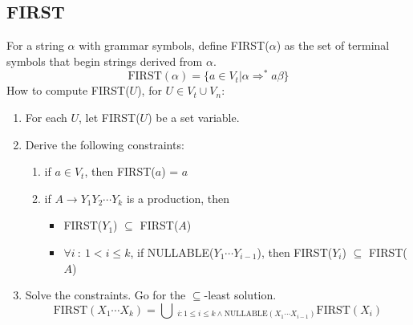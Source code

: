 \documentclass[10pt]{article}
\begin{document}
\subsection*{FIRST}
For a string $\alpha$ with grammar symbols, define FIRST($\alpha$) as the set of terminal symbols that begin strings derived from $\alpha$.
\[\text{FIRST}(\alpha) = \{a \in V_t \vert \alpha \Rightarrow ^* a\beta\}\]
How to compute FIRST($U$), for $U \in V_t \cup V_n$:
\begin{enumerate}
    \item For each $U$, let FIRST($U$) be a set variable.
    \item Derive the following constraints:
    \begin{enumerate}
        \item if $a \in V_t$, then FIRST($a$) = { $a$ }
        \item if $A \rightarrow Y_1Y_2\cdots Y_k$ is a production, then 
            \begin{itemize}
                \item FIRST($Y_1$) $\subseteq$ FIRST($A$)
                \item $\forall i \::\: 1 < i \leq k$, if NULLABLE($Y_1\cdots Y_{i - 1}$), then FIRST($Y_i$) $\subseteq$ FIRST($A$)
            \end{itemize}
    \end{enumerate}
    \item Solve the constraints.  Go for the $\subseteq$-least solution.
    \[\text{FIRST}(X_1\cdots X_k) = \bigcup \:_{i:1\leq i \leq k \land \text{NULLABLE}(X_1\cdots X_{i - 1})}\text{FIRST}(X_i)\]
\end{enumerate}
\end{document}
